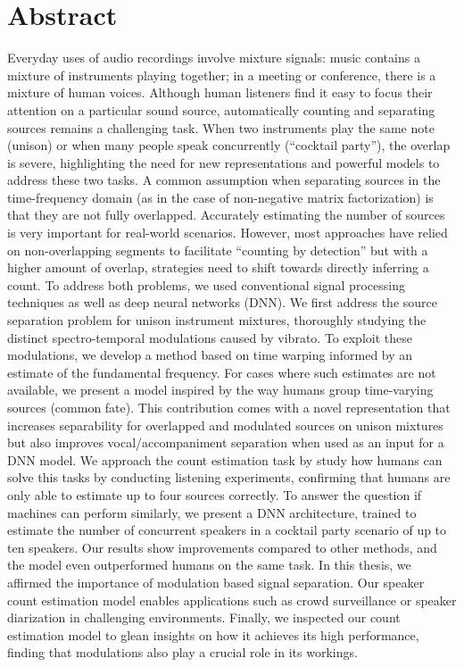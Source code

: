 \begingroup
\let\clearpage\relax
\let\cleardoublepage\relax
\let\cleardoublepage\relax

\chapter*{Abstract}
Everyday uses of audio recordings involve mixture signals: music contains a mixture of instruments playing together; in a meeting or conference, there is a mixture of human voices.
Although human listeners find it easy to focus their attention on a particular sound source, automatically counting and separating sources remains a challenging task.
When two instruments play the same note (unison) or when many people speak concurrently (``cocktail party''), the overlap is severe, highlighting the need for new representations and powerful models to address these two tasks.
A common assumption when separating sources in the time-frequency domain (as in the case of non-negative matrix factorization) is that they are not fully overlapped.
Accurately estimating the number of sources is very important for real-world scenarios.
However, most approaches have relied on non-overlapping segments to facilitate ``counting by detection'' but with a higher amount of overlap, strategies need to shift towards directly inferring a count.
To address both problems, we used conventional signal processing techniques as well as deep neural networks (DNN).
We first address the source separation problem for unison instrument mixtures, 
thoroughly studying the distinct spectro-temporal modulations caused by vibrato. 
To exploit these modulations, we develop a method based on time warping informed by an estimate of the fundamental frequency. 
For cases where such estimates are not available, we present a model inspired by the way humans group time-varying sources (common fate).
This contribution comes with a novel representation that increases separability for overlapped and modulated sources on unison mixtures but also improves vocal/accompaniment separation when used as an input for a DNN model.
We approach the count estimation task by study how humans can solve this tasks by conducting listening experiments, confirming that humans are only able to estimate up to four sources correctly.
To answer the question if machines can perform similarly, we present a DNN architecture, trained to estimate the number of concurrent speakers in a cocktail party scenario of up to ten speakers.
Our results show improvements compared to other methods, and the model even outperformed humans on the same task.
In this thesis, we affirmed the importance of modulation based signal separation. 
Our speaker count estimation model enables applications such as crowd surveillance or speaker diarization in challenging environments.
Finally, we inspected our count estimation model to glean insights on how it achieves its high performance, finding that modulations also play a crucial role in its workings.

